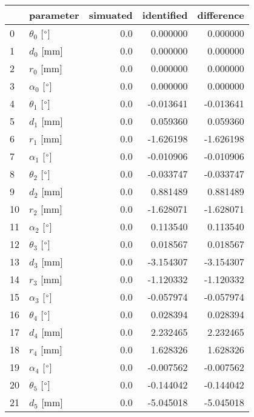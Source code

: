 \documentclass{standalone}%
\begin{document}
%
\normalsize%
\begin{tabular}{llrrr}
\toprule
{} &                 parameter & simuated & identified & difference \\
\midrule
0  &  $\theta_{0}$ [$\degree$] &      0.0 &   0.000000 &   0.000000 \\
1  &              $d_{0}$ [mm] &      0.0 &   0.000000 &   0.000000 \\
2  &              $r_{0}$ [mm] &      0.0 &   0.000000 &   0.000000 \\
3  &  $\alpha_{0}$ [$\degree$] &      0.0 &   0.000000 &   0.000000 \\
4  &  $\theta_{1}$ [$\degree$] &      0.0 &  -0.013641 &  -0.013641 \\
5  &              $d_{1}$ [mm] &      0.0 &   0.059360 &   0.059360 \\
6  &              $r_{1}$ [mm] &      0.0 &  -1.626198 &  -1.626198 \\
7  &  $\alpha_{1}$ [$\degree$] &      0.0 &  -0.010906 &  -0.010906 \\
8  &  $\theta_{2}$ [$\degree$] &      0.0 &  -0.033747 &  -0.033747 \\
9  &              $d_{2}$ [mm] &      0.0 &   0.881489 &   0.881489 \\
10 &              $r_{2}$ [mm] &      0.0 &  -1.628071 &  -1.628071 \\
11 &  $\alpha_{2}$ [$\degree$] &      0.0 &   0.113540 &   0.113540 \\
12 &  $\theta_{3}$ [$\degree$] &      0.0 &   0.018567 &   0.018567 \\
13 &              $d_{3}$ [mm] &      0.0 &  -3.154307 &  -3.154307 \\
14 &              $r_{3}$ [mm] &      0.0 &  -1.120332 &  -1.120332 \\
15 &  $\alpha_{3}$ [$\degree$] &      0.0 &  -0.057974 &  -0.057974 \\
16 &  $\theta_{4}$ [$\degree$] &      0.0 &   0.028394 &   0.028394 \\
17 &              $d_{4}$ [mm] &      0.0 &   2.232465 &   2.232465 \\
18 &              $r_{4}$ [mm] &      0.0 &   1.628326 &   1.628326 \\
19 &  $\alpha_{4}$ [$\degree$] &      0.0 &  -0.007562 &  -0.007562 \\
20 &  $\theta_{5}$ [$\degree$] &      0.0 &  -0.144042 &  -0.144042 \\
21 &              $d_{5}$ [mm] &      0.0 &  -5.045018 &  -5.045018 \\

\end{tabular}
\end{document}
